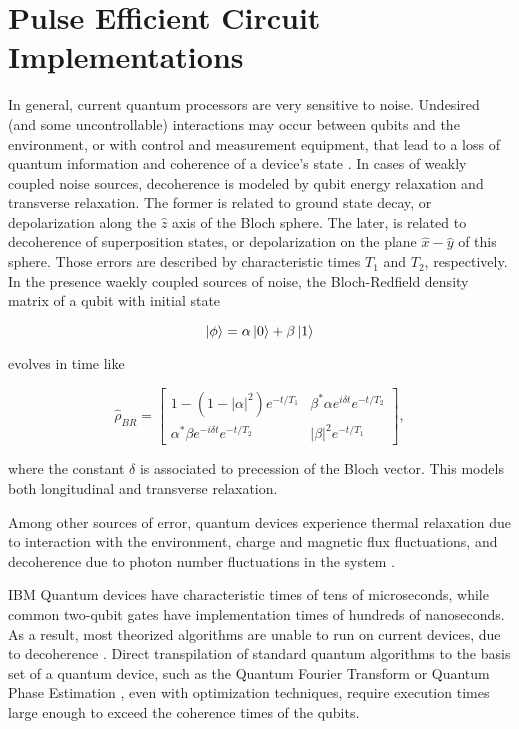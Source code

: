     

\section{Pulse Efficient Circuit Implementations}
\label{sec:pulseFunda}

  In general, current quantum processors are very sensitive to noise. Undesired (and some uncontrollable) interactions may occur between qubits and the environment, or with control and measurement equipment, that lead to a loss of quantum information and coherence of a device's state \cite{quantumEngineer}. In cases of weakly coupled noise sources, decoherence is modeled by qubit energy relaxation and transverse relaxation. The former is related to ground state decay, or depolarization along the $\hat{z}$ axis of the Bloch sphere. The later, is related to decoherence of superposition states, or depolarization on the plane $\hat{x}-\hat{y}$ of this sphere. Those errors are described by characteristic times $T_1$ and $T_2$, respectively. In the presence waekly coupled sources of noise, the Bloch-Redfield density matrix of a qubit with initial state

  \begin{equation}
    \ket{\phi} = \alpha \ket{0} + \beta \ket{1}
    \label{eq:BlochState}
  \end{equation}
  
  \noindent evolves in time like \cite{quantumEngineer}

  \begin{equation}
    \hat{\rho}_{BR} = \begin{bmatrix}
      1 - (1 - |\alpha|^2)e^{-t/T_1} & \beta^{*}\alpha e^{i \delta t} e^{-t/T_2} \\
      \alpha^{*}\beta e^{-i \delta t} e^{-t/T_2} & |\beta|^2e^{-t/T_1}
    \end{bmatrix},
  \end{equation}

  \noindent where the constant $\delta$ is associated to precession of the Bloch vector. This models both longitudinal and transverse relaxation.
  
  Among other sources of error, quantum devices experience thermal relaxation due to interaction with the environment, charge and magnetic flux fluctuations, and decoherence due to photon number fluctuations in the system \cite{quantumEngineer}. 
  
  IBM Quantum devices have characteristic times of tens of microseconds, while common two-qubit gates have implementation times of hundreds of nanoseconds. As a result, most theorized algorithms are unable to run on current devices, due to decoherence \cite{MajoranaSimulation, RXZPulseEfficient, QuantumChem2, QuantumChem1}. Direct transpilation of standard quantum algorithms to the basis set of a quantum device, such as the Quantum Fourier Transform or Quantum Phase Estimation \cite{Nielsen}, even with optimization techniques, require execution times large enough to exceed the coherence times of the qubits.

